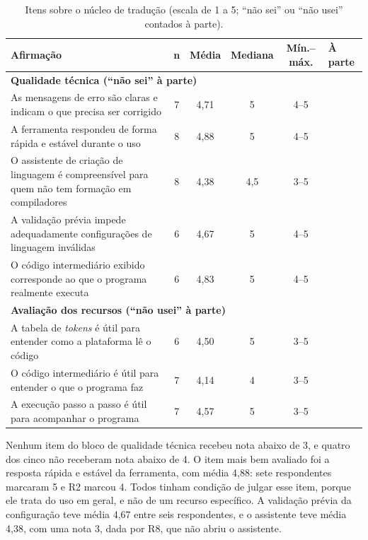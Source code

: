 \begin{table}[htbp]
\centering
\caption{Itens sobre o núcleo de tradução (escala de 1 a 5; ``não sei'' ou ``não usei'' contados à parte).}
\label{tab:resultado-nucleo}
\footnotesize
\renewcommand{\arraystretch}{1.2}
\begin{tabular}{|p{7.8cm}|c|c|c|c|p{1.3cm}|}
\hline
\textbf{Afirmação} & \textbf{n} & \textbf{Média} & \textbf{Mediana} & \textbf{Mín.--máx.} & \textbf{À parte} \\\hline
\multicolumn{6}{|l|}{\textbf{Qualidade técnica (``não sei'' à parte)}} \\\hline
As mensagens de erro são claras e indicam o que precisa ser corrigido & 7 & 4,71 & 5 & 4--5 & \centering\arraybackslash 1 \\\hline
A ferramenta respondeu de forma rápida e estável durante o uso & 8 & 4,88 & 5 & 4--5 & \centering\arraybackslash 0 \\\hline
O assistente de criação de linguagem é compreensível para quem não tem formação em compiladores & 8 & 4,38 & 4,5 & 3--5 & \centering\arraybackslash 0 \\\hline
A validação prévia impede adequadamente configurações de linguagem inválidas & 6 & 4,67 & 5 & 4--5 & \centering\arraybackslash 2 \\\hline
O código intermediário exibido corresponde ao que o programa realmente executa & 6 & 4,83 & 5 & 4--5 & \centering\arraybackslash 2 \\\hline
\multicolumn{6}{|l|}{\textbf{Avaliação dos recursos (``não usei'' à parte)}} \\\hline
A tabela de \textit{tokens} é útil para entender como a plataforma lê o código & 6 & 4,50 & 5 & 3--5 & \centering\arraybackslash 2 \\\hline
O código intermediário é útil para entender o que o programa faz & 7 & 4,14 & 4 & 3--5 & \centering\arraybackslash 1 \\\hline
A execução passo a passo é útil para acompanhar o programa & 7 & 4,57 & 5 & 3--5 & \centering\arraybackslash 1 \\\hline
\end{tabular}
\end{table}

Nenhum item do bloco de qualidade técnica recebeu nota abaixo de 3, e quatro dos cinco não receberam nota abaixo de 4. O item mais bem avaliado foi a resposta rápida e estável da ferramenta, com média 4,88: sete respondentes marcaram 5 e R2 marcou 4. Todos tinham condição de julgar esse item, porque ele trata do uso em geral, e não de um recurso específico. A validação prévia da configuração teve média 4,67 entre seis respondentes, e o assistente teve média 4,38, com uma nota 3, dada por R8, que não abriu o assistente.

